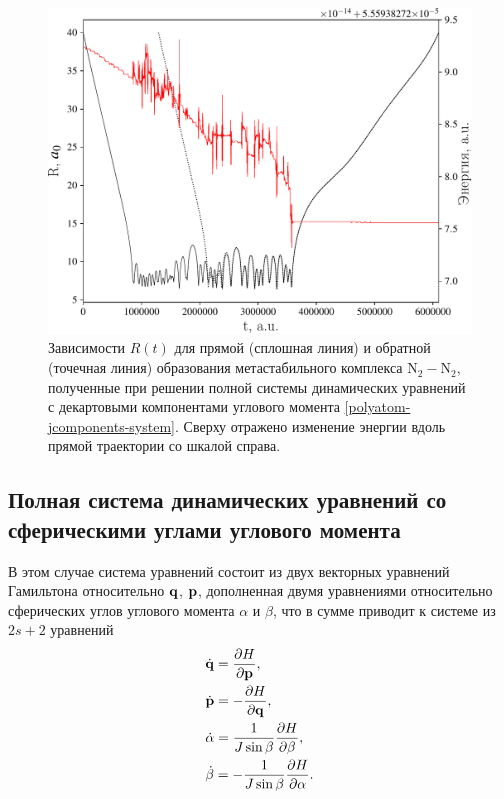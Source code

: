 \begin{figure}[H]
    \centering
    \includegraphics[width=0.75\linewidth]{./pictures/trajectories/jcomponents-trajectory-crop.pdf}
    \caption{Зависимости $R(t)$ для прямой (сплошная линия) и обратной (точечная линия) образования метастабильного комплекса N$_2-$N$_2$, полученные при решении полной системы динамических уравнений с декартовыми компонентами углового момента \eqref{polyatom-jcomponents-system}. Сверху отражено изменение энергии вдоль прямой траектории со шкалой справа.}
    \label{fig:jcomponents-trajectory}
\end{figure}


\subsection{Полная система динамических уравнений со сферическими углами углового момента}
В этом случае система уравнений состоит из двух векторных уравнений Гамильтона относительно $\mathbf{q}$, $\mathbf{p}$, дополненная двумя уравнениями относительно сферических углов углового момента $\alpha$ и $\beta$, что в сумме приводит к системе из $2s + 2$ уравнений
\begin{gather}
    \begin{aligned}
        &\dot{\mathbf{q}} = \frac{\partial H}{\partial \mathbf{p}}, \\
        &\dot{\mathbf{p}} = -\frac{\partial H}{\partial \mathbf{q}}, \\
        &\dot{\alpha} = \frac{1}{J \sin \beta} \frac{\partial H}{\partial \beta}, \\
        &\dot{\beta} = -\frac{1}{J \sin \beta} \frac{\partial H}{\partial \alpha}.
    \end{aligned}
\end{gather}

